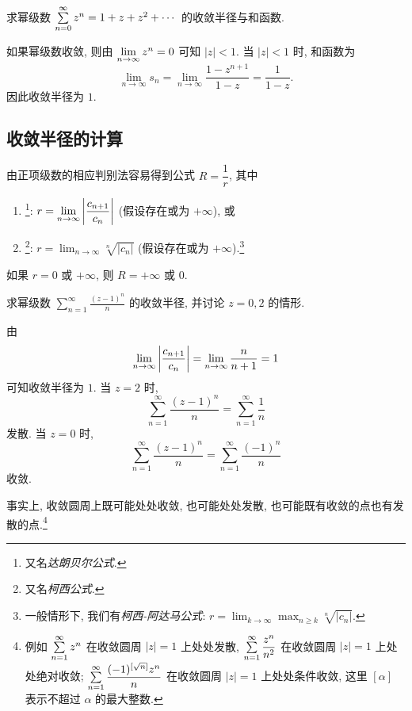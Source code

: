 \begin{example}
	求幂级数 $\sum\limits_{n=0}^\infty z^n=1+z+z^2+\cdots$ 的收敛半径与和函数.
\end{example}

\begin{solution}
	如果幂级数收敛, 则由 $\lim\limits_{n\rightarrow\infty}z^n=0$ 可知 $|z|<1$.
	{当 $|z|<1$ 时, 和函数为
		\[\lim_{n\to\infty}s_n=\lim_{n\to\infty}\frac{1-z^{n+1}}{1-z}=\frac1{1-z}.\]因此收敛半径为 $1$.}
\end{solution}

\subsection{收敛半径的计算}

由正项级数的相应判别法容易得到公式 $R=\dfrac1r$, 其中
\begin{enumerate}
	\item {}\footnote{又名\emph{达朗贝尔公式}.}: $r=\displaystyle\lim_{n\to\infty}\left|\frac{c_{n+1}}{c_n}\right|$ (假设存在或为 $+\infty$), 或
	\item {}\footnote{又名\emph{柯西公式}.}: $r=\displaystyle\lim_{n\to\infty}\sqrt[n]{|c_n|}$ (假设存在或为 $+\infty$).\footnote{一般情形下, 我们有\emph{柯西-阿达马公式}: $r=\displaystyle\lim_{k\to\infty}\max_{n\ge k}\sqrt[n]{|c_n|}$.}
\end{enumerate}
如果 $r=0$ 或 $+\infty$, 则 $R=+\infty$ 或 $0$.

\begin{example}
	求幂级数 $\displaystyle\sum_{n=1}^\infty\frac{(z-1)^n}n$ 的收敛半径, 并讨论 $z=0,2$ 的情形.
\end{example}

\begin{solution}
	由
	\[
		 \lim_{n\to\infty}\left|\frac{c_{n+1}}{c_n}\right|
		=\lim_{n\to\infty}\frac n{n+1}=1
	\]
	可知收敛半径为 $1$. 当 $z=2$ 时,
	\[
		\sum_{n=1}^\infty\frac{(z-1)^n}n=\sum_{n=1}^\infty\frac1n
	\]
	发散. 当 $z=0$ 时,
	\[
		\sum_{n=1}^\infty\frac{(z-1)^n}n=\sum_{n=1}^\infty\frac{(-1)^n}n
	\]
	收敛.
\end{solution}

事实上, \alert{收敛圆周上既可能处处收敛, 也可能处处发散, 也可能既有收敛的点也有发散的点}.\footnote{
	例如 $\sum\limits_{n=1}^\infty z^n$ 在收敛圆周 $|z|=1$ 上处处发散, $\sum\limits_{n=1}^\infty\dfrac{z^n}{n^2}$ 在收敛圆周 $|z|=1$ 上处处绝对收敛; $\sum\limits_{n=1}^\infty\dfrac{(-1)^{[\sqrt n]}z^n}{n}$ 在收敛圆周 $|z|=1$ 上处处条件收敛, 这里 $[\alpha]$ 表示不超过 $\alpha$ 的最大整数.
}

